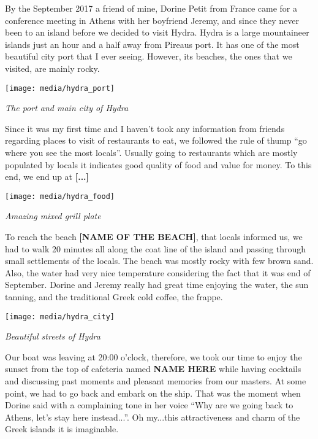 \documentclass[10pt,a4paper]{article} %
\begin{document}
\begin{multicols}{3}
By the September 2017 a friend of mine, Dorine Petit from France came for a 
conference meeting in Athens with her boyfriend Jeremy, and since they 
never been to an island before we decided to visit Hydra. 
Hydra is a large mountaineer islands just an hour and a half away from Pireaus 
port. 
It has one of the most beautiful city port that I ever seeing. 
However, its beaches, the ones that we visited, are mainly rocky.  

\begin{center}
	\texttt{[image: media/hydra\_port]}
	\par\textit{The port and main city of Hydra}
\end{center}

Since it was my first time and I haven't took any information from friends 
regarding places to visit of restaurants to eat, we followed the rule of thump 
``go where you see the most locals''. 
Usually going to restaurants which are mostly populated by locals it indicates 
good quality of food and value for money. 
To this end, we end up at \textbf{[...]}

\begin{center}
	\texttt{[image: media/hydra\_food]}
	\par\textit{Amazing mixed grill plate}
\end{center}

To reach the beach \textbf{[NAME OF THE BEACH]}, that locals informed us, 
we had to walk 20 minutes all along the coat line of the island and passing 
through small settlements of the locals. 
The beach was mostly rocky with few brown sand. 
Also, the water had very nice temperature considering the fact that it was 
end of September. 
Dorine and Jeremy really had great time enjoying the water, the sun tanning, 
and the traditional Greek cold coffee, the frappe. 

\begin{center}
	\texttt{[image: media/hydra\_city]}
	\par\textit{Beautiful streets of Hydra}
\end{center}

Our boat was leaving at 20:00 o'clock, therefore, we took our time to enjoy 
the sunset from the top of cafeteria named \textbf{NAME HERE} while having 
cocktails and discussing past moments and pleasant memories from our masters. 
At some point, we had to go back and embark on the ship. 
That was the moment when Dorine said with a complaining tone in her voice 
``Why are we going back to Athens, let's stay here instead...''. 
Oh my...this attractiveness and charm of the Greek islands it is imaginable.


\end{multicols}
\end{document}

